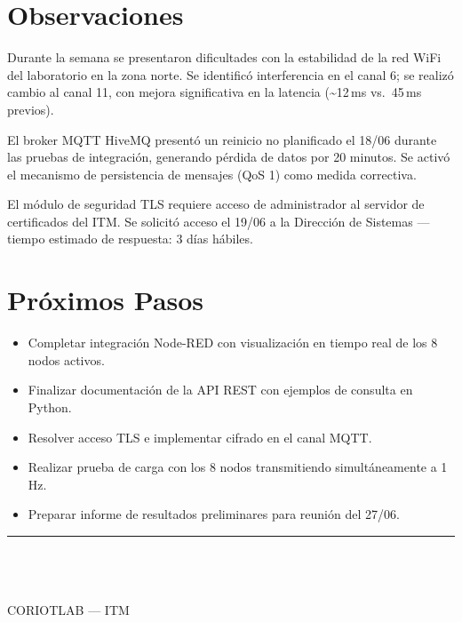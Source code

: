 \documentclass[12pt, letterpaper]{article}
\newcommand{\FirmaSimple}{%
  \vspace{2.5em}
  \noindent\begin{minipage}{8cm}
    {\color{AzulITM}\rule{7cm}{0.6pt}}\\[4pt]
    {\small\bfseries\color{GrisPizarra}\DocAutor}\\[2pt]
    {\footnotesize\color{GrisMedio}\DocCargo}\\[1pt]
    {\footnotesize\color{GrisMedio}CORIOTLAB --- ITM}\\[1pt]
    {\footnotesize\color{GrisMedio}\DocFecha}
  \end{minipage}
}
\begin{document}

\section{Observaciones}

Durante la semana se presentaron dificultades con la estabilidad de la red WiFi del laboratorio en la zona norte. Se identificó interferencia en el canal 6; se realizó cambio al canal 11, con mejora significativa en la latencia (\textasciitilde12\,ms vs.\ 45\,ms previos).

El broker MQTT HiveMQ presentó un reinicio no planificado el 18/06 durante las pruebas de integración, generando pérdida de datos por 20 minutos. Se activó el mecanismo de persistencia de mensajes (QoS 1) como medida correctiva.

\begin{tcolorbox}[cajaNota]
  El módulo de seguridad TLS requiere acceso de administrador al servidor de certificados del ITM. Se solicitó acceso el 19/06 a la Dirección de Sistemas --- tiempo estimado de respuesta: 3 días hábiles.
\end{tcolorbox}

\section{Próximos Pasos}

\begin{itemize}[label={\color{AzulITM}\textbf{>}}, leftmargin=1.8em, itemsep=4pt]
  \item Completar integración Node-RED con visualización en tiempo real de los 8 nodos activos.
  \item Finalizar documentación de la API REST con ejemplos de consulta en Python.
  \item Resolver acceso TLS e implementar cifrado en el canal MQTT.
  \item Realizar prueba de carga con los 8 nodos transmitiendo simultáneamente a 1\,Hz.
  \item Preparar informe de resultados preliminares para reunión del 27/06.
\end{itemize}

\FirmaSimple

\end{document}
